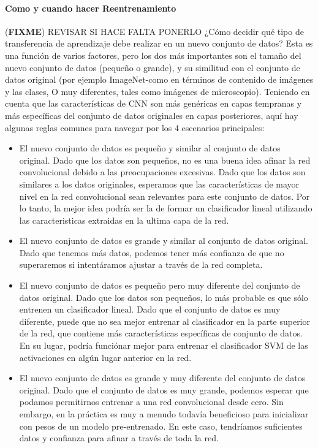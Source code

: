 \documentclass[a4paper,11pt,spanish]{book}
\newcommand*{\FIXME}[1]{{(\textbf{FIXME}) {#1}}}
\begin{document}
      \paragraph{Como y cuando hacer Reentrenamiento}
      \FIXME{REVISAR SI HACE FALTA PONERLO}
	¿Cómo decidir qué tipo de transferencia de aprendizaje debe realizar en un nuevo conjunto de datos? Esta es una función de varios factores, pero los dos más importantes son el
	tamaño del nuevo conjunto de datos (pequeño o grande), y su similitud con el conjunto de datos original (por ejemplo ImageNet-como en términos de contenido de imágenes y las clases,
	O muy diferentes, tales como imágenes de microscopio). Teniendo en cuenta que las características de CNN son más genéricas en capas tempranas y más específicas del conjunto de datos
	originales en capas posteriores, aquí hay algunas reglas comunes para navegar por los 4 escenarios principales:
	\begin{itemize}
	  \item El nuevo conjunto de datos es pequeño y similar al conjunto de datos original. Dado que los datos son pequeños, no es una buena idea afinar la red convolucional debido a las
	  preocupaciones excesivas. Dado que los datos son similares a los datos originales, esperamos que las características de mayor nivel en la red convolucional sean relevantes para este
	  conjunto de datos. Por lo tanto, la mejor idea podría ser la de formar un clasificador lineal utilizando las caracteristicas extraidas en la ultima capa de la red.
	  \item El nuevo conjunto de datos es grande y similar al conjunto de datos original. Dado que tenemos más datos, podemos tener más confianza de que no superaremos si intentáramos
	  ajustar a través de la red completa.
	  \item El nuevo conjunto de datos es pequeño pero muy diferente del conjunto de datos original. Dado que los datos son pequeños, lo más probable es que sólo entrenen un clasificador
	  lineal. Dado que el conjunto de datos es muy diferente, puede que no sea mejor entrenar al clasificador en la parte superior de la red, que contiene más características específicas
	  de conjunto de datos. En su lugar, podría funciónar mejor para entrenar el clasificador SVM de las activaciones en algún lugar anterior en la red.
	  \item El nuevo conjunto de datos es grande y muy diferente del conjunto de datos original. Dado que el conjunto de datos es muy grande, podemos esperar que podamos permitirnos
	  entrenar a una red convolucional desde cero. Sin embargo, en la práctica es muy a menudo todavía beneficioso para inicializar con pesos de un modelo pre-entrenado.
	  En este caso, tendríamos suficientes datos y confianza para afinar a través de toda la red.
	\end{itemize}
\end{document}
